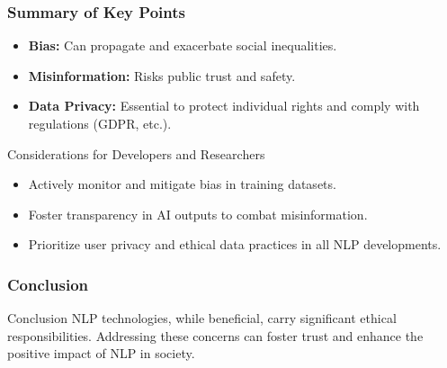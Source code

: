 \documentclass{beamer}
\begin{document}
\begin{frame}[fragile]
    \frametitle{Summary of Key Points}
    \begin{itemize}
        \item \textbf{Bias:} Can propagate and exacerbate social inequalities.
        \item \textbf{Misinformation:} Risks public trust and safety.
        \item \textbf{Data Privacy:} Essential to protect individual rights and comply with regulations (GDPR, etc.).
    \end{itemize}
    
    \begin{block}{Considerations for Developers and Researchers}
        \begin{itemize}
            \item Actively monitor and mitigate bias in training datasets.
            \item Foster transparency in AI outputs to combat misinformation.
            \item Prioritize user privacy and ethical data practices in all NLP developments.
        \end{itemize}
    \end{block}
\end{frame}

\begin{frame}[fragile]
    \frametitle{Conclusion}
    \begin{block}{Conclusion}
        NLP technologies, while beneficial, carry significant ethical responsibilities. Addressing these concerns can foster trust and enhance the positive impact of NLP in society.
    \end{block}
\end{frame}
\end{document}
